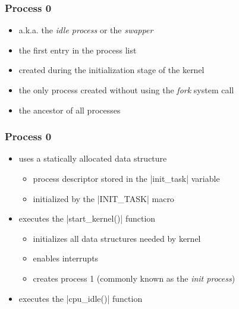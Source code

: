 \documentclass[dvipsnames]{beamer}
\begin{document}
\begin{frame}
  \frametitle{Process 0}

  \begin{itemize}
    \item a.k.a. the \textit{idle process} or the \textit{swapper}
    \item the first entry in the process list
    \item created during the initialization stage of the kernel
    \item the only process created without using the \textit{fork} system call
    \item the ancestor of all processes
  \end{itemize}
\end{frame}

\begin{frame}
  \frametitle{Process 0}

  \begin{itemize}
    \item uses a statically allocated data structure
    \begin{itemize}
      \item process descriptor stored in the |init_task| variable
      \item initialized by the |INIT_TASK| macro
    \end{itemize}

    \item executes the |start_kernel()| function
    \begin{itemize}
      \item initializes all data structures needed by kernel
      \item enables interrupts
      \item creates process 1 (commonly known as the \textit{init process})
    \end{itemize}

    \item executes the |cpu_idle()| function
  \end{itemize}
\end{frame}
\end{document}
